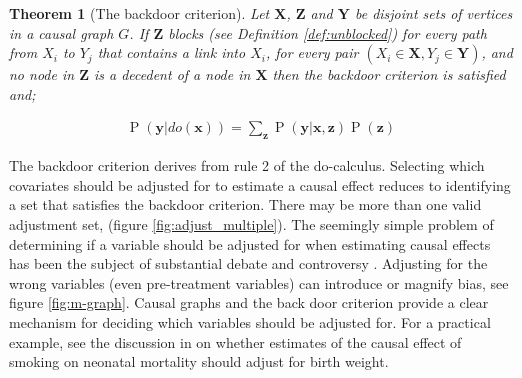 \documentclass[11pt,a4paper,twoside]{report}
\newcommand{\eqn}[1]{\begin{align}#1\end{align}}
\renewcommand{\P}[1]{\operatorname{P}\left(#1\right)}
\theoremstyle{plain}
\newtheorem{theorem}{Theorem}
\theoremstyle{definition}
\begin{document}
\vspace*{0.3cm}
\begin{theorem}[The backdoor criterion]\citep{Pearl2000}
Let $\boldsymbol{X}$, $\boldsymbol{Z}$ and $\boldsymbol{Y}$ be disjoint sets of vertices in a causal graph $G$. If $\boldsymbol{Z}$ blocks (see Definition \ref{def:unblocked}) for every path from $X_i$ to $Y_j$ that contains a link into $X_i$, for every pair $(X_i \in \boldsymbol{X},Y_j \in \boldsymbol{Y})$, and no node in $\boldsymbol{Z}$ is a decedent of a node in $\boldsymbol{X}$ then the backdoor criterion is satisfied and;

\eqn{
\label{eqn:backdoor}
\P{\boldsymbol{y}|do(\boldsymbol{x})} =\sum_{\boldsymbol{z}} \P{\boldsymbol{y}|\boldsymbol{x},\boldsymbol{z}}\P{\boldsymbol{z}}
}
\end{theorem}

The backdoor criterion derives from rule 2 of the do-calculus. Selecting which covariates should be adjusted for to estimate a causal effect reduces to identifying a set that satisfies the backdoor criterion. There may be more than one valid adjustment set, (figure \ref{fig:adjust_multiple}). The seemingly simple problem of determining if a variable should be adjusted for when estimating causal effects has been the subject of substantial debate and controversy \citep{pearl2009myth}. Adjusting for the wrong variables (even pre-treatment variables) can introduce or magnify bias, see figure \ref{fig:m-graph}. Causal graphs and the back door criterion provide a clear mechanism for deciding which variables should be adjusted for. For a practical example, see the discussion in \citet{schisterman2009overadjustment} on whether estimates of the causal effect of smoking on neonatal mortality should adjust for birth weight.
\end{document}
